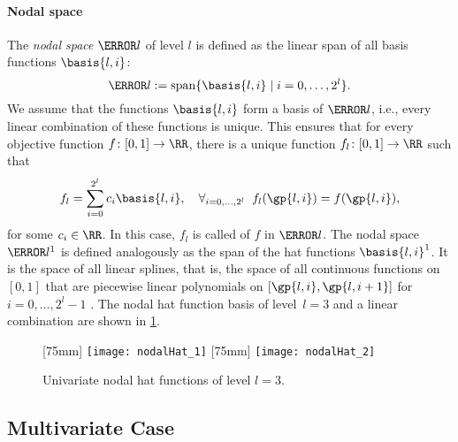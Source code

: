 \paragraph{Nodal space}

%
The \emph{nodal space} $\ns{l}$ of level $l$
is defined as the linear span of all basis functions
$\basis{l,i}$:
\begin{equation}
  \ns{l} := \spn\{\basis{l,i} \mid i = 0, \dotsc, 2^l\}.
\end{equation}
We assume that the functions $\basis{l,i}$ form a basis of $\ns{l}$, i.e.,
every linear combination of these functions is unique.
%
%
This ensures that for every objective function $f\colon [0, 1] \to \RR$,
there is a unique function $f_l\colon [0, 1] \to \RR$ such that
\begin{equation}
  \label{eq:interpFullGridUV}
  f_l
  = \sum_{i=0}^{2^l} c_i \basis{l,i},\quad
  \fa{i = 0, \dotsc, 2^l}{f_l(\gp{l,i}) = f(\gp{l,i})},
\end{equation}
for some $c_i \in \RR$.
In this case, $f_l$ is called  of $f$ in $\ns{l}$.
The nodal space $\ns{l}^1$ is defined analogously as the span of the
hat functions $\basis{l,i}^1$.
It is the space of all linear splines,
that is, the space of all continuous functions on $[0, 1]$ that are
piecewise linear polynomials on $[\gp{l,i}, \gp{l,i+1}]$ for
$i = 0, \dotsc, 2^l - 1$ \cite{Hoellig13Approximation}.
The nodal hat function basis of level~$l = 3$
and a linear combination are shown in \cref{fig:nodalHat}.

\begin{figure}
  [75mm]{%
    \texttt{[image: nodalHat\_1]}%
  }%
  \hfill%
  [75mm]{%
    \texttt{[image: nodalHat\_2]}%
  }%
  \caption{Univariate nodal hat functions of level $l = 3$.}
  \label{fig:nodalHat}
\end{figure}



\subsection{Multivariate Case}
\label{sec:212nodalMV}

